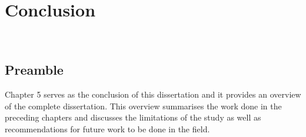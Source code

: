 \chapter{Conclusion}
\thispagestyle{empty}
\vspace{40em}
\hrulefill
\\
\newpage
		\section{Preamble}
		Chapter 5 serves as the conclusion of this dissertation and it provides an overview of the complete dissertation. This overview summarises the work done in the preceding chapters and discusses the limitations of the study as well as recommendations for future work to be done in the field.
